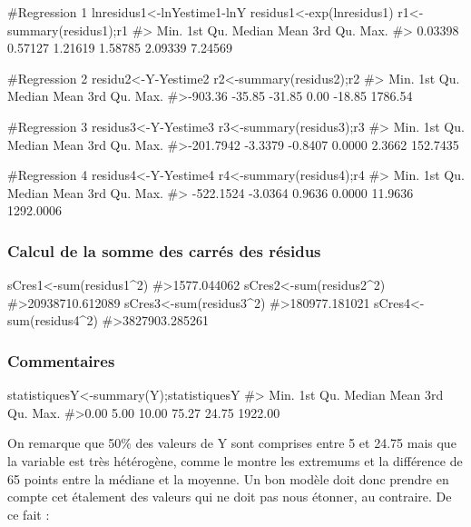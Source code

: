 \begin{Schunk}
\begin{Sinput}
#Regression 1
lnresidus1<-lnYestime1-lnY
residus1<-exp(lnresidus1)
r1<-summary(residus1);r1
#> Min.    1st Qu.  Median    Mean  3rd Qu.    Max. 
#> 0.03398 0.57127 1.21619 1.58785 2.09339 7.24569

#Regression 2
residu2<-Y-Yestime2
r2<-summary(residus2);r2
#> Min.    1st Qu.  Median    Mean  3rd Qu.    Max. 
#>-903.36  -35.85  -31.85    0.00  -18.85 1786.54 

#Regression 3
residus3<-Y-Yestime3
r3<-summary(residus3);r3
#> Min.    1st Qu.  Median            Mean  3rd Qu.    Max. 
#>-201.7942   -3.3379   -0.8407    0.0000    2.3662  152.7435 

#Regression 4
residus4<-Y-Yestime4
r4<-summary(residus4);r4
#> Min.           1st Qu.  Median    Mean  3rd Qu.    Max. 
#> -522.1524   -3.0364    0.9636    0.0000   11.9636 1292.0006
\end{Sinput}
\end{Schunk}

\hypertarget{calcul-de-la-somme-des-carruxe9s-des-ruxe9sidus}{%
\subsubsection{Calcul de la somme des carrés des
résidus}\label{calcul-de-la-somme-des-carruxe9s-des-ruxe9sidus}}

\begin{Schunk}
\begin{Sinput}
sCres1<-sum(residus1^2)
#>1577.044062
sCres2<-sum(residus2^2)
#>20938710.612089
sCres3<-sum(residus3^2)
#>180977.181021
sCres4<-sum(residus4^2)
#>3827903.285261
\end{Sinput}
\end{Schunk}

\hypertarget{commentaires}{%
\subsubsection{Commentaires}\label{commentaires}}

\begin{Schunk}
\begin{Sinput}
statistiquesY<-summary(Y);statistiquesY
#> Min.   1st Qu.  Median   Mean  3rd Qu. Max. 
#>0.00    5.00   10.00   75.27   24.75 1922.00
\end{Sinput}
\end{Schunk}

On remarque que 50\% des valeurs de Y sont comprises entre 5 et 24.75
mais que la variable est très hétérogène, comme le montre les extremums
et la différence de 65 points entre la médiane et la moyenne. Un bon
modèle doit donc prendre en compte cet étalement des valeurs qui ne doit
pas nous étonner, au contraire. De ce fait :

